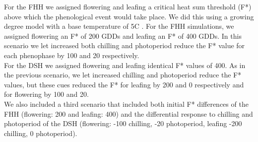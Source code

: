 \documentclass{article}\usepackage[]{graphicx}\usepackage[]{color}
\begin{document}
\noindent For the FHH we assigned flowering and leafing a critical heat sum threshold (F*) above which the phenological event would take place. We did this using a growing degree model with a base temperature of 5\degree C \citep{Fu:2014aa}. For the FHH simulations, we assigned flowering an F* of 200 GDDs and leafing an F* of 400 GDDs. In this scenario we let increased both chilling and photoperiod reduce the F* value for each phenophase by 100 and 20 respectively.\\

\noindent For the DSH we assigned flowering and leafing identical F* values of 400. As in the previous scenario, we let increased chilling and photoperiod reduce the F* values, but these cues reduced the F* for leafing by 200 and 0 respectively and for flowering by 100 and 20.\\

\noindent We also included a third scenario that included both initial F* differences of the FHH (flowering: 200 and leafing: 400) and the differential response to chilling and photoperiod of the DSH (flowering: -100 chilling, -20 photoperiod, leafing -200 chilling, 0 photoperiod).

 
\end{document}
